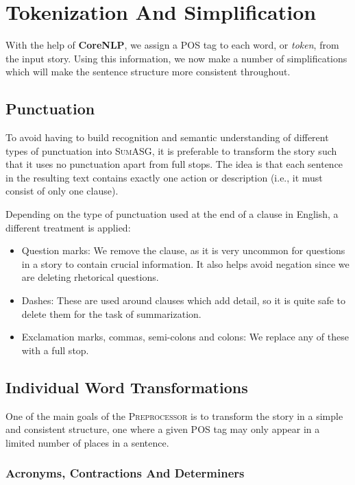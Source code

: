 \section{Tokenization And Simplification}
\label{sec:tokenization_simplification}

With the help of \textbf{CoreNLP}, we assign a POS tag to each word, or \textit{token}, from the input story. Using this information, we now make a number of simplifications which will make the sentence structure more consistent throughout.

\subsection{Punctuation}
\label{subsec:punctuation}

To avoid having to build recognition and semantic understanding of different types of punctuation into \textsc{SumASG}, it is preferable to transform the story such that it uses no punctuation apart from full stops. The idea is that each sentence in the resulting text contains exactly one action or description (i.e., it must consist of only one clause).

Depending on the type of punctuation used at the end of a clause in English, a different treatment is applied:

\begin{itemize}
\item Question marks: We remove the clause, as it is very uncommon for questions in a story to contain crucial information. It also helps avoid negation since we are deleting rhetorical questions.
\item Dashes: These are used around clauses which add detail, so it is quite safe to delete them for the task of summarization.
\item Exclamation marks, commas, semi-colons and colons: We replace any of these with a full stop.
\end{itemize}

\subsection{Individual Word Transformations}

One of the main goals of the \textsc{Preprocessor} is to transform the story in a simple and consistent structure, one where a given POS tag may only appear in a limited number of places in a sentence.

\subsubsection*{Acronyms, Contractions And Determiners}

